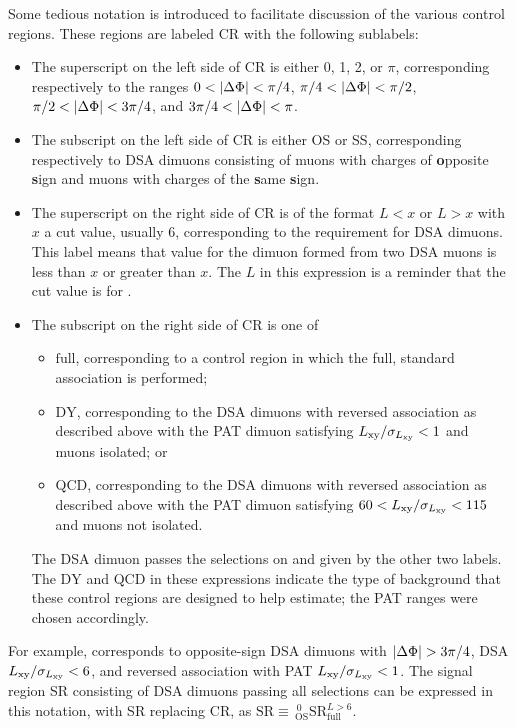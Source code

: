 Some tedious notation is introduced to facilitate discussion of the various control regions.
These regions are labeled CR with the following sublabels:
\begin{itemize}
  \item The superscript on the left side of CR is either 0, 1, 2, or $\pi$, corresponding respectively to the \DeltaPhi ranges $0 < |\Delta\Phi| < \pi/4$, $\pi/4 < |\Delta\Phi| < \pi/2$, $\pi/2 < |\Delta\Phi| < 3\pi/4$, and $3\pi/4 < |\Delta\Phi| < \pi$.
  \item The subscript on the left side of CR is either OS or SS, corresponding respectively to DSA dimuons consisting of muons with charges of \textbf{o}pposite \textbf{s}ign and muons with charges of the \textbf{s}ame \textbf{s}ign.
  \item The superscript on the right side of CR is of the format $L<x$ or $L>x$ with $x$ a cut value, usually 6, corresponding to the \LxySig requirement for DSA dimuons. This label means that \LxySig value for the dimuon formed from two DSA muons is less than $x$ or greater than $x$. The $L$ in this expression is a reminder that the cut value is for \LxySig.
  \item The subscript on the right side of CR is one of
    \begin{itemize}
      \item $\mathrm{full}$, corresponding to a control region in which the full, standard \DSAToPAT association is performed;
      \item $\mathrm{DY}$, corresponding to the DSA dimuons with reversed \DSAToPAT association as described above with the PAT dimuon satisfying $L_{\mathrm{xy}}/\sigma_{L_{\mathrm{xy}}} < 1$ and muons isolated; or
      \item $\mathrm{QCD}$, corresponding to the DSA dimuons with reversed \DSAToPAT association as described above with the PAT dimuon satisfying $60 < L_{\mathrm{xy}}/\sigma_{L_{\mathrm{xy}}} < 115$ and muons not isolated.
    \end{itemize}
    The DSA dimuon passes the selections on \DeltaPhi and \LxySig given by the other two labels. The $\mathrm{DY}$ and $\mathrm{QCD}$ in these expressions indicate the type of background that these control regions are designed to help estimate; the PAT \LxySig ranges were chosen accordingly.
\end{itemize}
For example,  corresponds to opposite-sign DSA dimuons with \mbox{$|\Delta\Phi| > 3\pi/4$}, DSA $L_{\mathrm{xy}}/\sigma_{L_{\mathrm{xy}}} < 6$, and reversed \DSAToPAT association with PAT $L_{\mathrm{xy}}/\sigma_{L_{\mathrm{xy}}} < 1$.
The signal region SR consisting of DSA dimuons passing all selections can be expressed in this notation, with SR replacing CR, as $\mathrm{SR} \equiv\, _{\mathrm{OS}}^{\,0}\mathrm{SR}_\mathrm{full}^{L>6}$.

